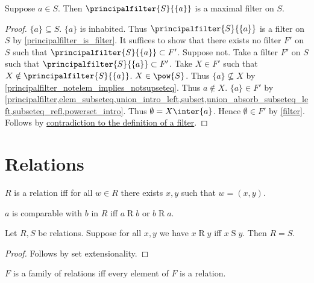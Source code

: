 \begin{proposition}\label{principalfilter_singleton_is_maximal_filter}
    Suppose $a\in S$.
    Then $\principalfilter{S}{\{a\}}$ is a maximal filter on $S$.
\end{proposition}
\begin{proof}
    $\{a\}\subseteq S$.
    $\{a\}$ is inhabited.
    Thus $\principalfilter{S}{\{a\}}$ is a filter on $S$ by \cref{principalfilter_is_filter}.
    It suffices to show that there exists no filter $F'$ on $S$ such that $\principalfilter{S}{\{a\}}\subset F'$.
    Suppose not.
    Take a filter $F'$ on $S$ such that $\principalfilter{S}{\{a\}}\subset F'$.
    Take $X\in F'$ such that $X\notin \principalfilter{S}{\{a\}}$.
    $X\in\pow{S}$.
    Thus $\{a\}\not\subseteq X$ by \cref{principalfilter_notelem_implies_notsupseteq}.
    Thus $a\notin X$.
    $\{a\}\in F'$
        by \cref{principalfilter,elem_subseteq,union_intro_left,subset,union_absorb_subseteq_left,subseteq_refl,powerset_intro}.
    Thus $\emptyset = X\inter \{a\}$.
    Hence $\emptyset\in F'$ by \cref{filter}.
    Follows by \hyperref[filter]{contradiction to the definition of a filter}.
\end{proof}
\section{Relations}

\begin{definition}\label{relation}
    $R$ is a relation iff
    for all $w\in R$ there exists $x, y$ such that $w = (x, y)$.
\end{definition}

\begin{definition}\label{comparable}
    $a$ is comparable with $b$ in $R$ iff $a\mathrel{R}b$ or $b\mathrel{R}a$.
\end{definition}

\begin{proposition}\label{relext}
    Let $R, S$ be relations.
    Suppose for all $x,y$ we have $x\mathrel{R} y$ iff $x\mathrel{S} y$.
    Then $R = S$.
\end{proposition}
\begin{proof}
    Follows by set extensionality.
\end{proof}

\begin{abbreviation}\label{family_of_relations}
    $F$ is a family of relations iff
    every element of $F$ is a relation.
\end{abbreviation}

